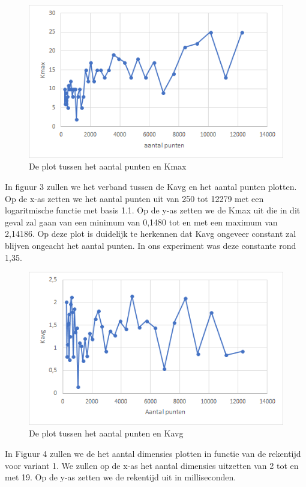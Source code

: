 \documentclass[12pt]{article}
\begin{document}
\begin{figure}
\includegraphics[width=\textwidth]{punten-Kmax.png}
\caption{De plot tussen het aantal punten en Kmax}
\end{figure}

In figuur 3 zullen we het verband tussen de Kavg en het aantal punten plotten.
Op de x-as zetten we het aantal punten uit van 250 tot 12279 met een logaritmische functie met basis 1.1.
Op de y-as zetten we de Kmax uit die in dit geval zal gaan van een minimum van 0,1480 tot en met een maximum van 2,14186.
Op deze plot is duidelijk te herkennen dat Kavg ongeveer constant zal blijven ongeacht het aantal punten.
In ons experiment was deze constante rond 1,35.

\begin{figure}
\includegraphics[width=\textwidth]{punten-Kavg}
\caption{De plot tussen het aantal punten en Kavg}
\end{figure}

In Figuur 4 zullen we de het aantal dimensies plotten in functie van de rekentijd voor variant 1.
We zullen op de x-as het aantal dimensies uitzetten van 2 tot en met 19.
Op de y-as zetten we de rekentijd uit in milliseconden.
\end{document}

